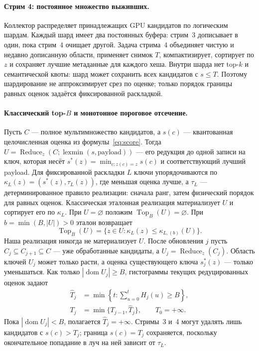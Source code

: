 \documentclass[10pt,twocolumn]{article}
\newcommand{\beam}{B}
\begin{document}
\paragraph{Стрим 4: постоянное множество выживших.}
Коллектор распределяет принадлежащих GPU кандидатов по логическим шардам.
Каждый шард имеет два постоянных буфера: стрим~3 дописывает в один, пока
стрим~4 очищает другой. Задача стрима~4 объединяет чистую и недавно дописанную
области, применяет снимок $T$, компактизирует, сортирует по $z$ и сохраняет
лучшие метаданные для каждого хеша. Внутри шарда нет top-$k$ и семантической
квоты: шард может сохранить всех кандидатов с $s\leq T$. Поэтому шардирование не
аппроксимирует срез по оценке; только порядок границы равных оценок задаётся
фиксированной раскладкой.

\paragraph{Классический top-$\beam$ и монотонное пороговое отсечение.}
Пусть $C$ --- полное мультимножество кандидатов, а $s(c)$ --- квантованная
целочисленная оценка из формулы~\eqref{eq:score}. Тогда
$U=\operatorname{Reduce}_{z}(C;\operatorname{lexmin}(s,\mathrm{payload}))$ ---
его редукция до одной записи на ключ,
которая несёт $s^*(z)=\min_{c:z(c)=z}s(c)$ и соответствующий лучший payload.
Для фиксированной раскладки $L$ ключи упорядочиваются по
$\kappa_L(z)=(s^*(z),\tau_L(z))$, где меньшая оценка лучше, а $\tau_L$ ---
детерминированное правило реализации: сначала ранг, затем физический порядок
для равных оценок. Классическая эталонная реализация материализует $U$
и сортирует его по $\kappa_L$. При $U=\varnothing$ положим
$\operatorname{Top}_{\beam}(U)=\varnothing$.
При $b=\min(\beam,|U|)>0$ эталон возвращает
\begin{equation}
 \operatorname{Top}_{\beam}(U)=
 \{z\in U:\kappa_L(z)\leq \kappa_{L,(b)}(U)\}.
 \label{eq:classical_topb}
\end{equation}
Наша реализация никогда не материализует $U$. После обновления $j$ пусть
$C_j\subseteq C_{j+1}\subseteq C$ --- уже обработанные кандидаты, а
$U_j=\operatorname{Reduce}_{z}(C_j)$. Область ключей $U_j$ может только расти,
а оценка существующего ключа $s_j^*(z)$ --- только уменьшаться. Как только
$|\operatorname{dom}U_j|\geq\beam$, гистограммы текущих редуцированных оценок
задают
\begin{align}
 \widehat T_j&=\min\left\{t:\sum_{u=0}^{t}H_j(u)\geq\beam\right\},\nonumber\\
 T_j&=\min\{T_{j-1},\widehat T_j\},\qquad T_0=+\infty.
 \label{eq:online_threshold}
\end{align}
Пока $|\operatorname{dom}U_j|<\beam$, полагается $\widehat T_j=+\infty$.
Стримы~3 и~4 могут удалять лишь кандидатов с $s(c)>T_j$; граница
$s(c)=T_j$ сохраняется, поскольку окончательное попадание в луч на ней зависит
от $\tau_L$.
\end{document}
